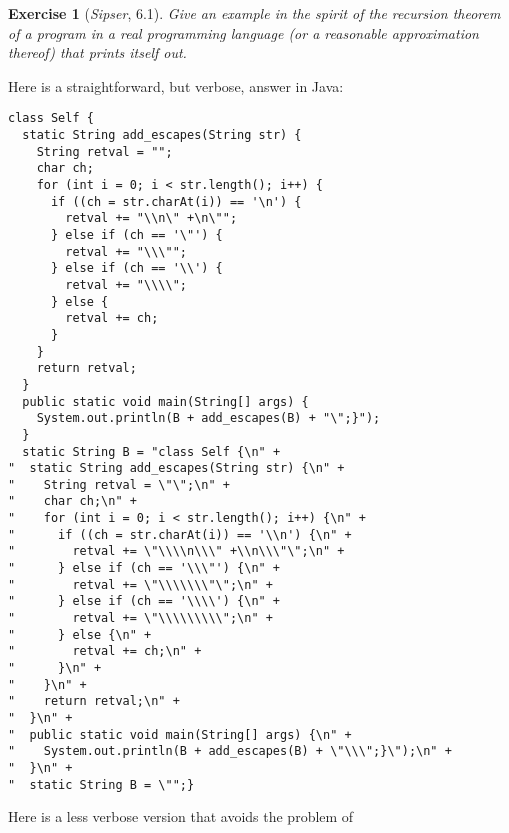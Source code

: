 \documentclass{article}
\theoremstyle{break}			%
\newtheorem{exercise}{Exercise}
\theoremstyle{plain}
\newcommand{\sipser}{\textit{Sipser}}
\begin{document}
\begin{exercise}[\sipser, 6.1]
Give an example in the spirit of the recursion theorem of a program in
a real programming language (or a reasonable approximation thereof)
that prints itself out.
\end{exercise}
Here is a straightforward, but verbose, answer in Java:
\begin{verbatim}
class Self {
  static String add_escapes(String str) {
    String retval = "";
    char ch;
    for (int i = 0; i < str.length(); i++) {
      if ((ch = str.charAt(i)) == '\n') {
        retval += "\\n\" +\n\"";
      } else if (ch == '\"') {
        retval += "\\\"";
      } else if (ch == '\\') {
        retval += "\\\\";
      } else {
        retval += ch;
      }
    }
    return retval;
  }
  public static void main(String[] args) {
    System.out.println(B + add_escapes(B) + "\";}");
  }
  static String B = "class Self {\n" +
"  static String add_escapes(String str) {\n" +
"    String retval = \"\";\n" +
"    char ch;\n" +
"    for (int i = 0; i < str.length(); i++) {\n" +
"      if ((ch = str.charAt(i)) == '\\n') {\n" +
"        retval += \"\\\\n\\\" +\\n\\\"\";\n" +
"      } else if (ch == '\\\"') {\n" +
"        retval += \"\\\\\\\"\";\n" +
"      } else if (ch == '\\\\') {\n" +
"        retval += \"\\\\\\\\\";\n" +
"      } else {\n" +
"        retval += ch;\n" +
"      }\n" +
"    }\n" +
"    return retval;\n" +
"  }\n" +
"  public static void main(String[] args) {\n" +
"    System.out.println(B + add_escapes(B) + \"\\\";}\");\n" +
"  }\n" +
"  static String B = \"";}
\end{verbatim}
\noindent Here is a less verbose version that avoids the problem of
\end{document}
